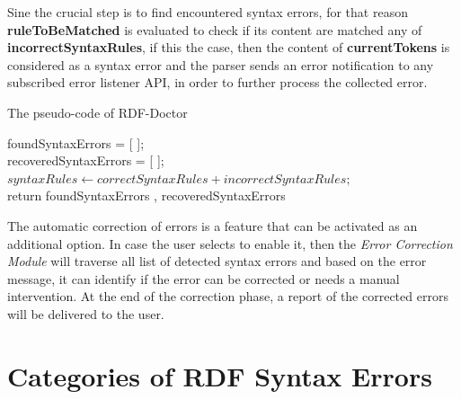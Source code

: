 Sine the crucial step is to find encountered syntax errors, for that reason \textbf{ruleToBeMatched} is evaluated to check if its content are matched any of \textbf{incorrectSyntaxRules}, if this the case, then the content of \textbf{currentTokens} is considered as a syntax error and the parser sends an error notification to any subscribed error listener API, in order to further process the collected error. 

\begin{algorithm}[] 
 \caption{The pseudo-code of RDF-Doctor}
 \label{alg:algorithm-main}
foundSyntaxErrors = [ ];\\
recoveredSyntaxErrors = [ ];\\
$syntaxRules \leftarrow correctSyntaxRules + incorrectSyntaxRules;$\\
return foundSyntaxErrors , recoveredSyntaxErrors
\end{algorithm}

The automatic correction of errors is a feature that can be activated as an additional option. 
In case the user selects to enable it, then the \emph{Error Correction Module} will traverse all list of detected syntax errors and based on the error message, it can identify if the error can be corrected or needs a manual intervention. 
At the end of the correction phase, a report of the corrected errors will be delivered to the user. 

\section{Categories of RDF Syntax Errors}

